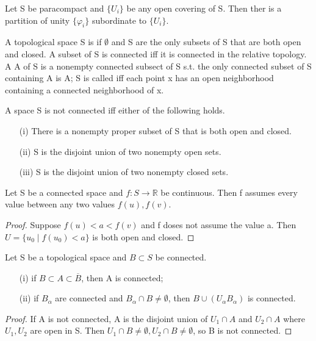 \begin{thm}
Let S be paracompact and $\{U_i\}$ be any open covering of S. Then ther is a partition of unity $\{\varphi_i\}$ subordinate to $\{U_i\}$.
\end{thm}
\begin{definition}
A topological space S is  if $\emptyset$ and S are the only subsets of S that are both open and closed. A subset of S is connected
iff it is connected in the relative topology. A  A of S is a nonempty connected subsect of S s.t. the only connected subset of S 
containing A is A; S is called  iff each point x has an open neighborhood containing a connected neighborhood of x.
\end{definition}
\begin{prop}
A space S is not connected iff either of the following holds.
\begin{enumerate}
\item[(i)] There is a nonempty proper subset of S that is both open and closed.
\item[(ii)] S is the disjoint union of two nonempty open sets.
\item[(iii)] S is the disjoint union of two nonempty closed sets.
\end{enumerate}
\end{prop}
\begin{prop}
Let S be a connected space and $f:S\rightarrow \mathbb{R}$ be continuous. Then f assumes every value between any two values $f(u),f(v)$.
\end{prop}
\begin{proof}
Suppose $f(u)<a<f(v)$ and f doses not assume the value a. Then $U=\lbrace u_0\mid f(u_0)<a\rbrace$ is both open and closed.
\end{proof}
\begin{prop}
Let S be a topological space and $B\subset S$ be connected.
\begin{enumerate}
\item[(i)] if $B\subset A \subset \overline{B}$, then A is connected;
\item[(ii)] if $B_\alpha$ are connected and $B_\alpha\cap B\neq \emptyset$, then $B\cup\left(U_\alpha B_\alpha\right)$ is connected.
\end{enumerate}
\end{prop}
\begin{proof}
If A is not connected, A is the disjoint union of $U_1\cap A$ and $U_2\cap A$ where $U_1,U_2$ are open in S. Then $U_1\cap B\neq \emptyset,
U_2\cap B\neq\emptyset$, so B is not connected.
\end{proof}
